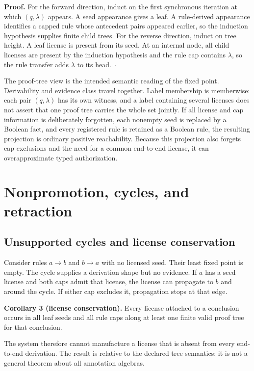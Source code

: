 \documentclass[pdflatex,sn-mathphys-num]{sn-jnl}
\begin{document}
\textbf{Proof.} For the forward direction, induct on the first synchronous iteration at which \((q,\lambda)\) appears. A seed appearance gives a leaf. A rule-derived appearance identifies a capped rule whose antecedent pairs appeared earlier, so the induction hypothesis supplies finite child trees. For the reverse direction, induct on tree height. A leaf license is present from its seed. At an internal node, all child licenses are present by the induction hypothesis and the rule cap contains \(\lambda\), so the rule transfer adds \(\lambda\) to its head. \(\square\)

The proof-tree view is the intended semantic reading of the fixed point. Derivability and evidence class travel together. Label membership is memberwise: each pair \((q,\lambda)\) has its own witness, and a label containing several licenses does not assert that one proof tree carries the whole set jointly. If all license and cap information is deliberately forgotten, each nonempty seed is replaced by a Boolean fact, and every registered rule is retained as a Boolean rule, the resulting projection is ordinary positive reachability. Because this projection also forgets cap exclusions and the need for a common end-to-end license, it can overapproximate typed authorization.

\section{Nonpromotion, cycles, and retraction}\label{nonpromotion-cycles-and-retraction}

\subsection{Unsupported cycles and license conservation}\label{unsupported-cycles-and-license-conservation}

Consider rules \(a\rightarrow b\) and \(b\rightarrow a\) with no licensed seed. Their least fixed point is empty. The cycle supplies a derivation shape but no evidence. If \(a\) has a seed license and both caps admit that license, the license can propagate to \(b\) and around the cycle. If either cap excludes it, propagation stops at that edge.

\textbf{Corollary 3 (license conservation).} Every license attached to a conclusion occurs in all leaf seeds and all rule caps along at least one finite valid proof tree for that conclusion.

The system therefore cannot manufacture a license that is absent from every end-to-end derivation. The result is relative to the declared tree semantics; it is not a general theorem about all annotation algebras.
\end{document}
